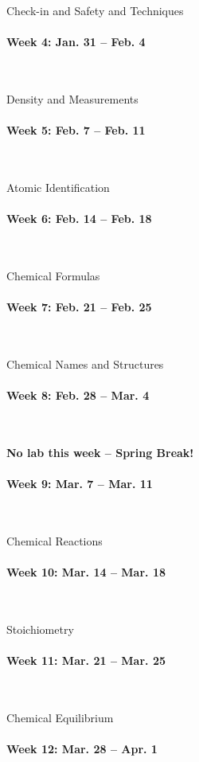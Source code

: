 \documentclass[12pt, letterpaper]{article}
\begin{document}
Check-in and Safety and Techniques

\paragraph{Week 4: Jan. 31 -- Feb. 4}~

Density and Measurements

\paragraph{Week 5: Feb. 7 -- Feb. 11}~

Atomic Identification

\paragraph{Week 6: Feb. 14 -- Feb. 18}~

Chemical Formulas

\paragraph{Week 7: Feb. 21 -- Feb. 25}~

Chemical Names and Structures

\paragraph{Week 8: Feb. 28 -- Mar. 4}~

\textbf{No lab this week -- Spring Break!}

\paragraph{Week 9: Mar. 7 -- Mar. 11}~

Chemical Reactions

\paragraph{Week 10: Mar. 14 -- Mar. 18}~

Stoichiometry

\paragraph{Week 11: Mar. 21 -- Mar. 25}~

Chemical Equilibrium

\paragraph{Week 12: Mar. 28 -- Apr. 1}~
\end{document}
